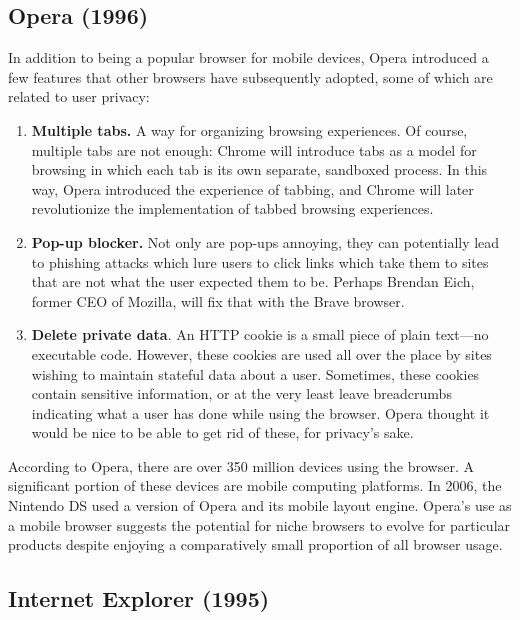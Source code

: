 \documentclass[a4paper, 11pt]{article} %
\begin{document}
\subsection{Opera (1996)}

In addition to being a popular browser for mobile devices, Opera introduced a few features that other browsers have subsequently adopted, some of which are related to user privacy:

\begin{enumerate}
	\item \textbf{Multiple tabs.} A way for organizing browsing experiences. Of course, multiple tabs are not enough: Chrome will introduce tabs as a model for browsing in which each tab is its own separate, sandboxed process. In this way, Opera introduced the experience of tabbing, and Chrome will later revolutionize the implementation of tabbed browsing experiences.
	\item \textbf{Pop-up blocker.} Not only are pop-ups annoying, they can potentially lead to phishing attacks which lure users to click links which take them to sites that are not what the user expected them to be. \cite{5feat81:online} Perhaps Brendan Eich, former CEO of Mozilla, will fix that with the Brave browser. \cite{Brave19:online}
	\item \textbf{Delete private data}. An HTTP cookie is a small piece of plain text---no executable code. However, these cookies are used all over the place by sites wishing to maintain stateful data about a user. \cite{Whata43:online} Sometimes, these cookies contain sensitive information, or at the very least leave breadcrumbs indicating what a user has done while using the browser. Opera thought it would be nice to be able to get rid of these, for privacy's sake.
\end{enumerate}

According to Opera, there are over 350 million devices using the browser. \cite{About26:online} A significant portion of these devices are mobile computing platforms. In 2006, the Nintendo DS used a version of Opera and its mobile layout engine. \cite{Givin8:online} Opera's use as a mobile browser suggests the potential for niche browsers to evolve for particular products despite enjoying a comparatively small proportion of all browser usage.

\subsection{Internet Explorer (1995)}
\end{document}
